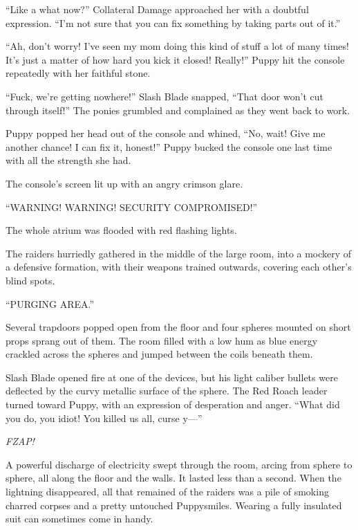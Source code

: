 ``Like a what now?'' Collateral Damage approached her with a doubtful expression. ``I'm not sure that you can fix something by taking parts out of it.''

``Ah, don't worry! I've seen my mom doing this kind of stuff a lot of many times! It's just a matter of how hard you kick it closed! Really!'' Puppy hit the console repeatedly with her faithful stone.

``Fuck, we're getting nowhere!'' Slash Blade snapped, ``That door won't cut through itself!'' The ponies grumbled and complained as they went back to work.

Puppy popped her head out of the console and whined, ``No, wait! Give me another chance! I can fix it, honest!'' Puppy bucked the console one last time with all the strength she had.

The console's screen lit up with an angry crimson glare.

{\mten ``WARNING! WARNING! SECURITY COMPROMISED!''}

The whole atrium was flooded with red flashing lights.

The raiders hurriedly gathered in the middle of the large room, into a mockery of a defensive formation, with their weapons trained outwards, covering each other's blind spots.

{\mten ``PURGING AREA.''}

Several trapdoors popped open from the floor and four spheres mounted on short props sprang out of them. The room filled with a low hum as blue energy crackled across the spheres and jumped between the coils beneath them.

Slash Blade opened fire at one of the devices, but his light caliber bullets were deflected by the curvy metallic surface of the sphere. The Red Roach leader turned toward Puppy, with an expression of desperation and anger. ``What did you do, you idiot! You killed us all, curse y---''

\emph{FZAP!}

A powerful discharge of electricity swept through the room, arcing from sphere to sphere, all along the floor and the walls. It lasted less than a second. When the lightning disappeared, all that remained of the raiders was a pile of smoking charred corpses and a pretty untouched Puppysmiles. Wearing a fully insulated suit can sometimes come in handy.



\horizonline


